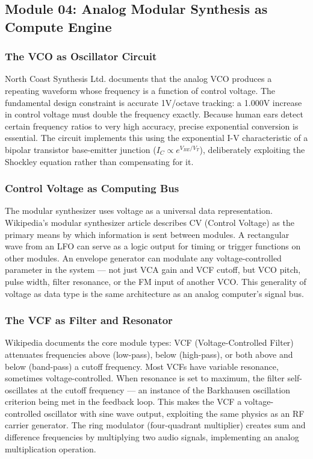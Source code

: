 \documentclass[11pt,letterpaper]{article}
\begin{document}
\subsection{Module 04: Analog Modular Synthesis as Compute Engine}

\subsubsection{The VCO as Oscillator Circuit}

North Coast Synthesis Ltd. documents that the analog VCO produces a repeating waveform whose frequency is a function of control voltage. The fundamental design constraint is accurate 1V/octave tracking: a 1.000V increase in control voltage must double the frequency exactly. Because human ears detect certain frequency ratios to very high accuracy, precise exponential conversion is essential. The circuit implements this using the exponential I-V characteristic of a bipolar transistor base-emitter junction ($I_C \propto e^{V_{BE}/V_T}$), deliberately exploiting the Shockley equation rather than compensating for it.

\subsubsection{Control Voltage as Computing Bus}

The modular synthesizer uses voltage as a universal data representation. Wikipedia's modular synthesizer article describes CV (Control Voltage) as the primary means by which information is sent between modules. A rectangular wave from an LFO can serve as a logic output for timing or trigger functions on other modules. An envelope generator can modulate any voltage-controlled parameter in the system --- not just VCA gain and VCF cutoff, but VCO pitch, pulse width, filter resonance, or the FM input of another VCO. This generality of voltage as data type is the same architecture as an analog computer's signal bus.

\subsubsection{The VCF as Filter and Resonator}

Wikipedia documents the core module types: VCF (Voltage-Controlled Filter) attenuates frequencies above (low-pass), below (high-pass), or both above and below (band-pass) a cutoff frequency. Most VCFs have variable resonance, sometimes voltage-controlled. When resonance is set to maximum, the filter self-oscillates at the cutoff frequency --- an instance of the Barkhausen oscillation criterion being met in the feedback loop. This makes the VCF a voltage-controlled oscillator with sine wave output, exploiting the same physics as an RF carrier generator. The ring modulator (four-quadrant multiplier) creates sum and difference frequencies by multiplying two audio signals, implementing an analog multiplication operation.
\end{document}
